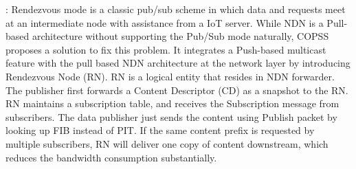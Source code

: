 \vspace{1mm}: Rendezvous mode is a classic pub/sub scheme in which data and requests meet at an intermediate node with assistance from a IoT server. While NDN is a Pull-based architecture without supporting the Pub/Sub mode naturally,  COPSS~\cite{chen2011copss} proposes a solution to fix this problem. It integrates a Push-based multicast feature with the pull based NDN architecture at the network layer by introducing Rendezvous Node (RN). RN is a logical entity that resides in NDN forwarder. The publisher first forwards a Content Descriptor (CD) as a snapshot to the RN. RN maintains a subscription table, and receives the Subscription message from subscribers. The data publisher just sends the content using Publish packet by looking up FIB instead of PIT. If the same content prefix is requested by multiple subscribers, RN will deliver one copy  of content downstream, which reduces the bandwidth consumption substantially.

